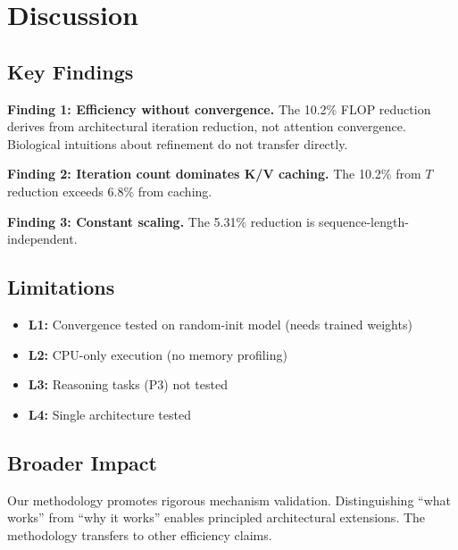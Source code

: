 \section{Discussion}
\label{sec:discussion}

\subsection{Key Findings}

\textbf{Finding 1: Efficiency without convergence.} The 10.2\% FLOP reduction derives from architectural iteration reduction, not attention convergence. Biological intuitions about refinement do not transfer directly.

\textbf{Finding 2: Iteration count dominates K/V caching.} The 10.2\% from $T$ reduction exceeds 6.8\% from caching.

\textbf{Finding 3: Constant scaling.} The 5.31\% reduction is sequence-length-independent.

\subsection{Limitations}

\begin{itemize}
    \item \textbf{L1:} Convergence tested on random-init model (needs trained weights)
    \item \textbf{L2:} CPU-only execution (no memory profiling)
    \item \textbf{L3:} Reasoning tasks (P3) not tested
    \item \textbf{L4:} Single architecture tested
\end{itemize}

\subsection{Broader Impact}

Our methodology promotes rigorous mechanism validation. Distinguishing ``what works'' from ``why it works'' enables principled architectural extensions. The methodology transfers to other efficiency claims.

